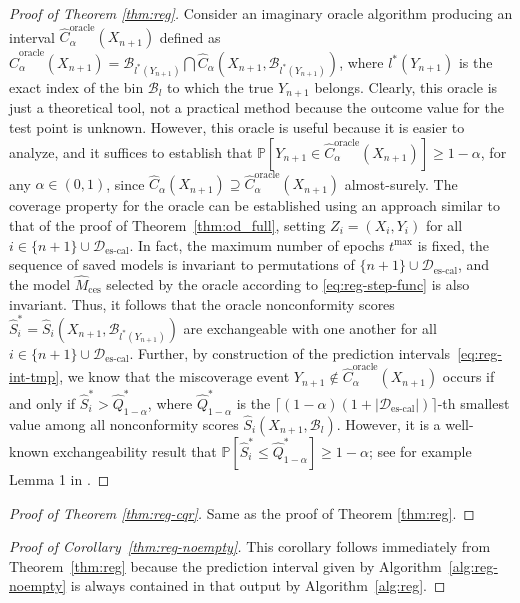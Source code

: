 \begin{proof}[Proof of Theorem \ref{thm:reg}]
Consider an imaginary oracle algorithm producing an interval $\hat{C}^{\text{oracle}}_{\alpha}(X_{n+1})$ defined as $\hat{C}^{\text{oracle}}_{\alpha}(X_{n+1}) = \mathcal{B}_{l^*(Y_{n+1})} \bigcap \hat{C}_{\alpha}(X_{n+1}, \mathcal{B}_{l^*(Y_{n+1})})$, where $l^*(Y_{n+1})$ is the exact index of the bin $\mathcal{B}_l$ to which the true $Y_{n+1}$ belongs. Clearly, this oracle is just a theoretical tool, not a practical method because the outcome value for the test point is unknown.
However, this oracle is useful because it is easier to analyze, and it suffices to establish that $\mathbb{P}[Y_{n+1} \in \hat{C}^{\text{oracle}}_{\alpha}(X_{n+1})] \geq 1-\alpha$, for any $\alpha \in (0,1)$, since $\hat{C}_{\alpha}(X_{n+1}) \supseteq \hat{C}^{\text{oracle}}_{\alpha}(X_{n+1})$ almost-surely.
The coverage property for the oracle can be established using an approach similar to that of the proof of Theorem~\ref{thm:od_full}, setting $Z_i=(X_i,Y_i)$ for all $i \in \{n+1\} \cup \mathcal{D}_{\text{es-cal}}$.
In fact, the maximum number of epochs $t^{\text{max}}$ is fixed, the sequence of saved models is invariant to permutations of $\{n+1\} \cup \mathcal{D}_{\text{es-cal}}$, and the  model $\hat{M}_{\text{ces}}$ selected by the oracle according to \eqref{eq:reg-step-func} is also invariant.
Thus, it follows that the oracle nonconformity scores $\hat{S}_i^* = \hat{S}_i(X_{n+1}, \mathcal{B}_{l^*(Y_{n+1})})$ are exchangeable with one another for all $i \in \{n+1\} \cup \mathcal{D}_{\text{es-cal}}$.
Further, by construction of the prediction intervals~\eqref{eq:reg-int-tmp}, we know that the miscoverage event $Y_{n+1} \not\in \hat{C}^{\text{oracle}}_{\alpha}(X_{n+1})$ occurs if and only if $\hat{S}^*_i > \hat{Q}^*_{1-\alpha}$, where $\hat{Q}^*_{1-\alpha}$ is the $\lceil (1-\alpha)(1+|\mathcal{D}_{\text{es-cal}}|) \rceil$-th smallest value among all nonconformity scores $\hat{S}_i(X_{n+1},\mathcal{B}_l)$.
However, it is a well-known exchangeability result that $\mathbb{P}[\hat{S}^*_i \leq \hat{Q}^*_{1-\alpha}] \geq 1-\alpha$; see for example Lemma 1 in \citet{romano2019conformalized}.
\end{proof}


\begin{proof}[Proof of Theorem \ref{thm:reg-cqr}]
Same as the proof of Theorem \ref{thm:reg}.
\end{proof}

\begin{proof}[Proof of Corollary~\ref{thm:reg-noempty}]
This corollary follows immediately from Theorem~\ref{thm:reg} because the prediction interval given by Algorithm~\ref{alg:reg-noempty} is always contained in that output by Algorithm~\ref{alg:reg}.
\end{proof}

